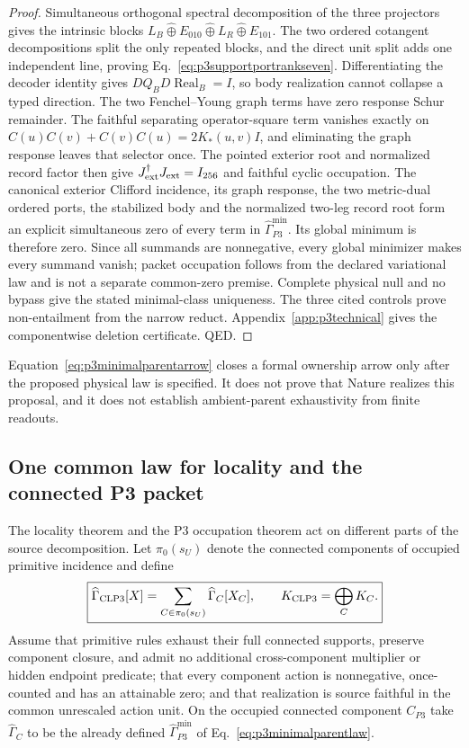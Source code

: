 \documentclass[11pt]{article}
\begin{document}
\begin{proof}
Simultaneous orthogonal spectral decomposition of the three projectors gives
the intrinsic blocks $L_B\widehat\oplus E_{010}
\widehat\oplus L_R\widehat\oplus E_{101}$.  The two ordered cotangent
decompositions split the only repeated blocks, and the direct unit split adds
one independent line, proving Eq.~\eqref{eq:p3supportportrankseven}.
Differentiating the decoder identity gives
$DQ_BD\operatorname{Real}_B=I$, so body realization cannot collapse a typed
direction.  The two Fenchel--Young graph terms have zero response Schur
remainder.  The faithful separating operator-square term vanishes exactly on
$C(u)C(v)+C(v)C(u)=2K_*(u,v)I$, and eliminating the graph response leaves
that selector once.  The pointed exterior root and normalized record factor
then give $J_{\rm ext}^\dagger J_{\rm ext}=I_{256}$ and faithful cyclic
occupation.  The canonical exterior Clifford incidence, its graph response,
the two metric-dual ordered ports, the stabilized body and the normalized
two-leg record root form an explicit simultaneous zero of every term in
$\widehat\Gamma_{P3}^{\min}$.  Its global minimum is therefore zero.  Since
all summands are nonnegative, every global minimizer makes every summand
vanish; packet occupation follows from the declared variational law and is
not a separate common-zero premise.  Complete physical null and no bypass
give the stated
minimal-class uniqueness.  The three cited controls prove non-entailment from
the narrow reduct.  Appendix~\ref{app:p3technical} gives the componentwise
deletion certificate.  QED.
\end{proof}

Equation~\eqref{eq:p3minimalparentarrow} closes a formal ownership arrow only
after the proposed physical law is specified.  It does not prove that Nature
realizes this proposal, and it does not establish ambient-parent
exhaustivity from finite readouts.

\subsection{One common law for locality and the connected P3 packet}
\label{sec:jointlocalp3}

The locality theorem and the P3 occupation theorem act on different parts of
the source decomposition.  Let $\pi_0(s_U)$ denote the connected components
of occupied primitive incidence and define
\begin{equation}
 \boxed{
 \widehat\Gamma_{\rm CLP3}[X]
 =\sum_{C\in\pi_0(s_U)}\widehat\Gamma_C[X_C],
 \qquad K_{\rm CLP3}=\bigoplus_C K_C.}
 \label{eq:jointlocalp3action}
\end{equation}
Assume that primitive rules exhaust their full connected supports, preserve
component closure, and admit no additional cross-component multiplier or
hidden endpoint predicate; that every component action is nonnegative,
once-counted and has an attainable zero; and that realization is source
faithful in the common unrescaled action unit.  On the occupied connected
component $C_{P3}$ take $\widehat\Gamma_C$ to be the already defined
$\widehat\Gamma_{P3}^{\min}$ of
Eq.~\eqref{eq:p3minimalparentlaw}.
\end{document}
